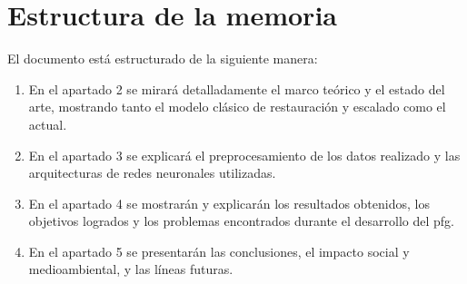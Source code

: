 
\section{Estructura de la memoria}


\quad El documento está estructurado de la siguiente manera: 
\begin{enumerate}
  \item En el apartado 2 se mirará detalladamente el marco teórico y el estado del arte, mostrando tanto el modelo clásico de restauración y escalado como el actual.
  \item En el apartado 3 se explicará el preprocesamiento de los datos realizado y las arquitecturas de redes neuronales utilizadas.
  \item En el apartado 4 se mostrarán y explicarán los resultados obtenidos, los objetivos logrados y los problemas encontrados durante el desarrollo del \gls{pfg}.
  \item En el apartado 5 se presentarán las conclusiones, el impacto social y medioambiental, y las líneas futuras.
  
\end{enumerate}

